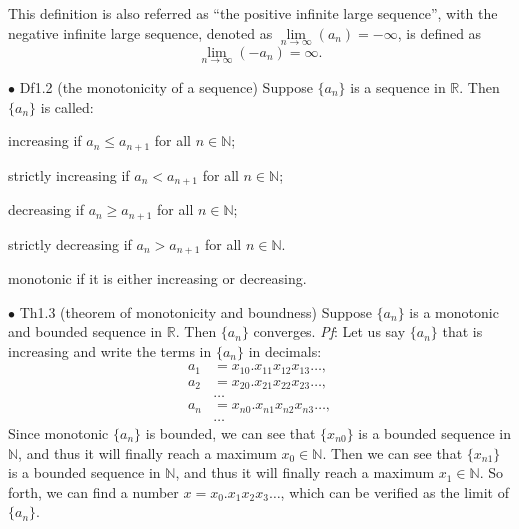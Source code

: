 \documentclass{article}
\begin{document}
\begin{Rmk}{}
    \textcolor{Df}{This definition is also referred as ``the positive infinite large sequence'', with the negative infinite large sequence, denoted as $\lim\limits_{n\to\infty}(a_n)=-\infty$, is defined as
    $$\lim\limits_{n\to\infty}(-a_n)=\infty.$$}
\end{Rmk}

\begin{Df}{$\bullet$ Df1.2 (the monotonicity of a sequence)}
    Suppose $\{a_n\}$ is a sequence in $\mathbb{R}$. Then $\{a_n\}$ is called:
    \begin{compactenum}
        \item increasing if $a_n\leq a_{n+1}$ for all $n\in\mathbb{N}$;
        \item strictly increasing if $a_n<a_{n+1}$ for all $n\in\mathbb{N}$;
        \item decreasing if $a_n\geq a_{n+1}$ for all $n\in\mathbb{N}$;
        \item strictly decreasing if $a_n>a_{n+1}$ for all $n\in\mathbb{N}$.
        \item monotonic if it is either increasing or decreasing.
    \end{compactenum}
\end{Df}

\begin{Th}{$\bullet$ Th1.3 (theorem of monotonicity and boundness)}
    Suppose $\{a_n\}$ is a monotonic and bounded sequence in $\mathbb{R}$. Then $\{a_n\}$ converges.
    \tcblower
    \textit{Pf}: Let us say $\{a_n\}$ that is increasing and write the terms in $\{a_n\}$ in decimals:
    $$
    \begin{aligned}
        a_1&=x_{10}.x_{11}x_{12}x_{13}\dots,\\
        a_2&=x_{20}.x_{21}x_{22}x_{23}\dots,\\
        &\dots\\
        a_n&=x_{n0}.x_{n1}x_{n2}x_{n3}\dots,\\
        &\dots
    \end{aligned}
    $$
    Since monotonic $\{a_n\}$ is bounded, we can see that $\{x_{n0}\}$ is a bounded sequence in $\mathbb{N}$, and thus it will finally reach a maximum $x_0\in\mathbb{N}$. Then we can see that $\{x_{n1}\}$ is a bounded sequence in $\mathbb{N}$, and thus it will finally reach a maximum $x_1\in\mathbb{N}$. So forth, we can find a number $x = x_0.x_1x_2x_3\dots$, which can be verified as the limit of $\{a_n\}$.
\end{Th}
\end{document}
